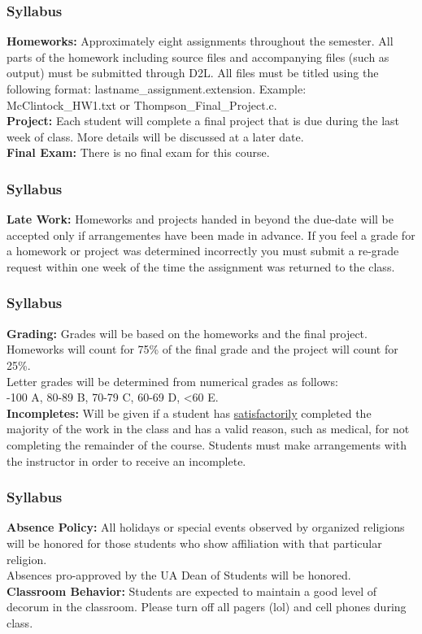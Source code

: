 \documentclass{beamer}
\begin{document}
\begin{frame}
  \frametitle{Syllabus}
  \textbf{Homeworks:} Approximately eight assignments throughout the semester. 
  All parts of the homework including source files and accompanying files 
  (such as output) must be submitted through D2L. 
  All files must be titled using the following format:
  lastname\_assignment.extension. Example: McClintock\_HW1.txt or 
  Thompson\_Final\_Project.c.\\
  \vspace{12pt}
  \textbf{Project:} Each student will complete a final project that 
  is due during the last week of class. More details will be discussed 
  at a later date.\\
  \vspace{12pt}
  \textbf{Final Exam:} There is no final exam for this course.
\end{frame}

\begin{frame}
  \frametitle{Syllabus}
  \textbf{Late Work:} Homeworks and projects handed in beyond the due-date
  will be accepted only if arrangementes have been made in advance. If
  you feel a grade for a homework or project was determined incorrectly
  you must submit a re-grade request within one week of the time the
  assignment was returned to the class.
\end{frame}

\begin{frame}
  \frametitle{Syllabus}
  \textbf{Grading:} Grades will be based on the homeworks and the 
  final project. Homeworks will count for 75\% of the final grade
  and the project will count for 25\%.\\
  Letter grades will be determined from numerical grades as follows:\\
  -100 A, 80-89 B, 70-79 C, 60-69 D, <60 E.\\
  \vspace{12pt}
  \textbf{Incompletes:} Will be given if a student has 
  \underline{satisfactorily} completed the majority of the work in the class 
  and has a valid reason, such as  medical, for not completing the 
  remainder of the course. Students must make arrangements with the 
  instructor in order to receive an incomplete.
\end{frame}

\begin{frame}
  \frametitle{Syllabus}
  \textbf{Absence Policy:} All holidays or special events observed 
  by organized religions will be honored for those students who show
  affiliation with that particular religion.\\
  Absences pro-approved by the UA Dean of Students will be honored.\\
  \vspace{12pt}
  \textbf{Classroom Behavior:} Students are expected to maintain a good 
  level of decorum in the classroom. Please turn off all pagers (lol)
  and cell phones during class.
\end{frame}
\end{document}
